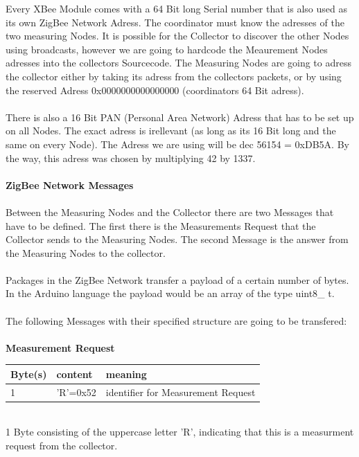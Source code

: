 \documentclass[
	11pt,
	a4paper
]{article}%
\begin{document}
Every XBee Module comes with a 64 Bit long Serial number that is also used as its own ZigBee Network Adress. The coordinator must know the adresses of the two measuring Nodes. It is possible for the Collector to discover the other Nodes using broadcasts, however we are going to hardcode the Meaurement Nodes adresses into the collectors Sourcecode. The Measuring Nodes are going to adress the collector either by taking its adress from the collectors packets, or by using the reserved Adress 0x0000000000000000 (coordinators 64 Bit adress).
\\\\
There is also a 16 Bit PAN (Personal Area Network) Adress that has to be set up on all Nodes. The exact adress is irellevant (as long as its 16 Bit long and the same on every Node). The Adress we are using will be dec 56154 = 0xDB5A. By the way, this adress was chosen by multiplying 42 by 1337.
\\\\
\textbf{ZigBee Network Messages}
\\\\
Between the Measuring Nodes and the Collector there are two Messages that have to be defined. The first there is the Measurements Request that the Collector sends to the Measuring Nodes. The second Message is the answer from the Measuring Nodes to the collector.
\\\\
Packages in the ZigBee Network transfer a payload of a certain number of bytes. In the Arduino language the payload would be an array of the type uint8\_ t.
\\\\
The following Messages with their specified structure are going to be transfered:\\\\
\textbf{Measurement Request}
\begin{table}[h]
    \begin{tabular}{|l|l|l|}
    \hline
    \rowcolor{dunkelgrau}
    Byte(s) & content  & meaning                            \\ \hline
    1       & 'R'=0x52 & identifier for Measurement Request \\ \hline
    \end{tabular}
\end{table}\\
1 Byte consisting of the uppercase letter 'R', indicating that this is a measurment request from the collector.
\\\\
\end{document}
